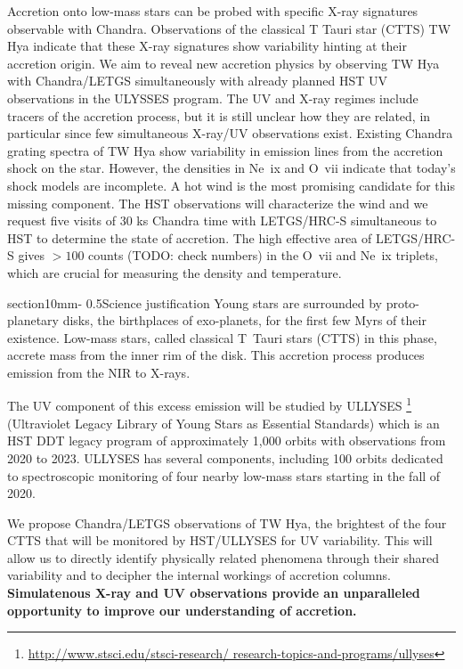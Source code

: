 \documentclass[letterpaper,11pt,twocolumn]{article}
\makeatletter
\renewcommand{\section}{\@startsection%
{section}{1}{0mm}{-\baselineskip}%
{0.5\baselineskip}{\normalfont\Large\bfseries}}%
\makeatother
\begin{document}
Accretion onto low-mass stars can be probed with specific X-ray
signatures observable with Chandra. Observations of the
classical T Tauri star (CTTS) TW Hya indicate that these X-ray
signatures show variability hinting at their accretion origin. We aim
to reveal new accretion physics by observing TW Hya with Chandra/LETGS
simultaneously with already planned HST UV observations in the ULYSSES
program.
The UV and X-ray regimes include tracers of the
accretion process, but it is still unclear how they are related, in
particular since few simultaneous X-ray/UV observations
exist. Existing Chandra grating spectra of TW Hya show variability in emission
lines from the accretion shock on the star. However, the densities in
Ne~{\sc ix} and O~{\sc vii} indicate that today's shock models are
incomplete. A hot wind is the most promising candidate for this
missing component. The HST observations will characterize the wind and
we request five visits of 30 ks Chandra time with LETGS/HRC-S
simultaneous to HST to determine the state of accretion. The high
effective area of LETGS/HRC-S gives $> 100$ counts (TODO: check
numbers) in the O~{\sc vii} and Ne~{\sc ix} triplets, which are
crucial for measuring the density and temperature.


\section{Science justification}
Young stars are surrounded by proto-planetary disks, the birthplaces of exo-planets, for the first few Myrs of their existence. Low-mass stars, called classical T~Tauri stars (CTTS) in this phase, accrete mass from the inner rim of the disk. This accretion process produces emission from the NIR to X-rays.

The UV component of this excess emission will be studied by ULLYSES 
\footnote{\url{http://www.stsci.edu/stsci-research/ research-topics-and-programs/ullyses}}
(Ultraviolet Legacy Library of Young Stars as Essential Standards) which is an HST DDT legacy program of  approximately 1,000 orbits with observations from 2020 to 2023. ULLYSES has several components, including 100 orbits dedicated to spectroscopic monitoring of four nearby low-mass stars  starting in the fall of 2020.

We propose Chandra/LETGS observations of TW Hya, the brightest of the four  CTTS that will be monitored by HST/ULLYSES for UV variability.
This will allow us to directly identify physically related phenomena through
their shared variability and to decipher the internal workings of accretion columns.  {\bf Simulatenous X-ray and UV
observations provide an unparalleled opportunity to improve
our understanding of accretion.}
\end{document}
